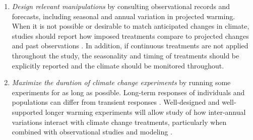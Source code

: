 \documentclass{article}
\begin{document}
\begin{enumerate}
\item\textit{Design relevant manipulations} by consulting observational records and forecasts, including seasonal and annual variation in projected warming. When it is not possible or desirable to match anticipated changes in climate, studies should report how imposed treatments compare to projected changes and past observations \citep[e.g.,][]{hoover2014}. In addition, if continuous treatments are not applied throughout the study, the seasonality and timing of treatments should be explicitly reported and the climate should be monitored throughout.

\item\textit{Maximize the duration of climate change experiments} by running some experiments for as long as possible. Long-term responses of individuals and populations can differ from transient responses \citep{saleska2002,franklin1989,giasson2013,harte2015}. Well-designed and well-supported longer warming experiments will allow study of how inter-annual variations interact with climate change treatments, particularly when combined with observational studies and modeling \citep{luo2011}.

\end{enumerate}

\end{document}
